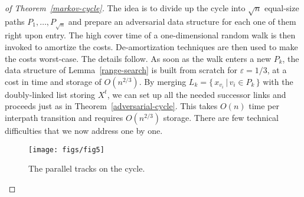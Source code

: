 \documentclass[oribibl,envcountsect,envcountsame]{llncs}
\begin{document}
\begin{proof}[of Theorem~\ref{markov-cycle}]
The idea is to divide up the cycle
into $\sqrt{n}$ equal-size paths $P_1,\ldots, P_{\sqrt{n}}$
and prepare an adversarial data structure for 
each one of them right upon entry. The high
cover time of a one-dimensional random walk 
is then invoked to amortize the costs.
De-amortization techniques are then used to make the costs worst-case.
The details follow. As soon as the walk enters
a new $P_k$, the data structure of Lemma~\ref{range-search}
is built from scratch for $\varepsilon=1/3$, at a cost in
time and storage of $O(n^{2/3})$.
By merging $L_k= \{\,x_{v_i}\,|\, v_i\in P_k\, \}$ with the doubly-linked list
storing $X^t$, we can set up all the needed successor links
and proceeds just as in Theorem~\ref{adversarial-cycle}.
This takes $O(n)$ time per interpath transition
and requires $O(n^{2/3})$ storage.
There are few technical difficulties that we now
address one by one.

\begin{figure}[ht]
\begin{center}
\texttt{[image: figs/fig5]}
\end{center}
\caption{The parallel tracks on the cycle.}
\label{fig:fig5}
\end{figure}



\end{proof}
\end{document}
